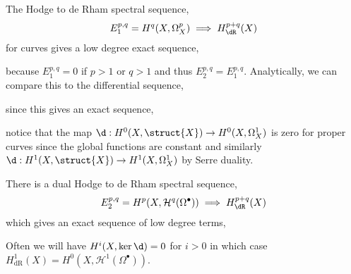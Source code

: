 \documentclass[12pt]{article}
\begin{document}
\begin{example}
The Hodge to de Rham spectral sequence,
\[ E_1^{p,q} = H^q(X, \Omega^p_X) \implies H^{p+q}_{\dR}(X) \]
for curves gives a low degree exact sequence,
\begin{center}
\end{center}
because $E^{p,q}_1 = 0$ if $p > 1$ or $q > 1$ and thus $E^{p,q}_2 = E^{p,q}_1$. Analytically, we can compare this to the differential sequence,
\begin{center}
\end{center}
since this gives an exact sequence,
\begin{center}
\end{center}
notice that the map $\d : H^0(X, \struct{X}) \to H^0(X, \Omega^1_X)$ is zero for proper curves since the global functions are constant and similarly $\d : H^1(X, \struct{X}) \to H^1(X, \Omega_X^1)$ by Serre duality.
\end{example}

\begin{example}
There is a dual Hodge to de Rham spectral sequence,
\[ E^{p,q}_2 = H^p(X, \mathcal{H}^q(\Omega^\bullet)) \implies H^{p+q}_{\dR}(X) \]
which gives an exact sequence of low degree terms,
\begin{center}
\end{center}
Often we will have $H^i(X, \ker{\d}) = 0$ for $i > 0$ in which case $H^1_{\mathrm{dR}}(X) = H^0(X, \mathcal{H}^1(\Omega^\bullet))$.
\end{example}
\end{document}
